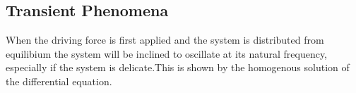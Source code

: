 \documentclass[a4paper]{article}
\numberwithin{equation}{section}
\begin{document}
\subsection{Transient Phenomena}

When the driving force is first applied and the system is distributed from equilibium the system will be inclined to oscillate at its natural frequency, especially if the system is delicate.This is shown by the homogenous solution of the differential equation. 
\end{document}
